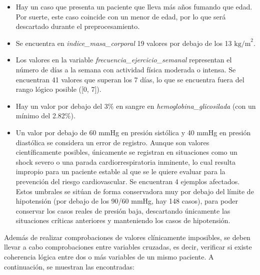 \documentclass[journal,onecolumn]{IEEEtran}
\begin{document}
\begin{itemize}
    \item Hay un caso que presenta un paciente que lleva más años fumando que edad. Por suerte, este caso coincide con un menor de edad, por lo que será descartado durante el preprocesamiento. 

    \item Se encuentra en \textit{indice\_masa\_corporal} 19 valores por debajo de los 13 $\text{kg/m}^2$.

    \item Los valores en la variable \textit{frecuencia\_ejercicio\_semanal} representan el número de días a la semana con actividad física moderada o intensa. Se encuentran 41 valores que superan los 7 días, lo que se encuentra fuera del rango lógico posible ([0, 7]).

    \item Hay un valor por debajo del 3\% en sangre en \textit{hemoglobina\_glicosilada} (con un mínimo del 2.82\%).

    \item Un valor por debajo de 60 mmHg en presión sistólica y 40 mmHg en presión diastólica se considera un error de registro. Aunque son valores científicamente posibles, únicamente se registran en situaciones como un shock severo o una parada cardiorrespiratoria inminente, lo cual resulta impropio para un paciente estable al que se le quiere evaluar para la prevención del riesgo cardiovascular. Se encuentran 4 ejemplos afectados. Estos umbrales se sitúan de forma conservadora muy por debajo del límite de hipotensión (por debajo de los 90/60 mmHg, hay 148 casos), para poder conservar los casos reales de presión baja, descartando únicamente las situaciones críticas anteriores y manteniendo los casos de hipotensión.
 
\end{itemize}

Además de realizar comprobaciones de valores clínicamente imposibles, se deben llevar a cabo comprobaciones entre variables cruzadas, es decir, verificar si existe coherencia lógica entre dos o más variables de un mismo paciente. A continuación, se muestran las encontradas:
\end{document}
